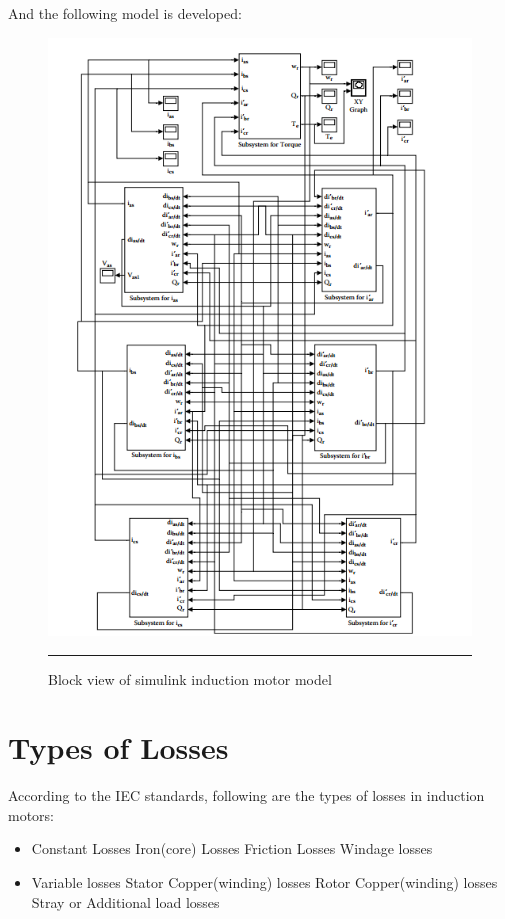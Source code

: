\clearpage
And the following model is developed:
\begin{figure}[htbp]
	\centering
		\includegraphics[width = 4.5in]{./Figures/MS/eq28.png}
		\rule{35em}{0.5pt}
	\caption{Block view of simulink induction motor model}
	\label{fig:Block view of simulink induction motor model}
\end{figure}

\clearpage
\section{Types of Losses}
According to the IEC standards\cite{iec6003421}, following are the types of losses in induction motors:
\begin{itemize}
\item Constant Losses
\subitem Iron(core) Losses
\subitem Friction Losses
\subitem Windage losses
\item Variable losses
\subitem Stator Copper(winding) losses
\subitem Rotor Copper(winding) losses
\subitem Stray or Additional load losses 
\end{itemize}

